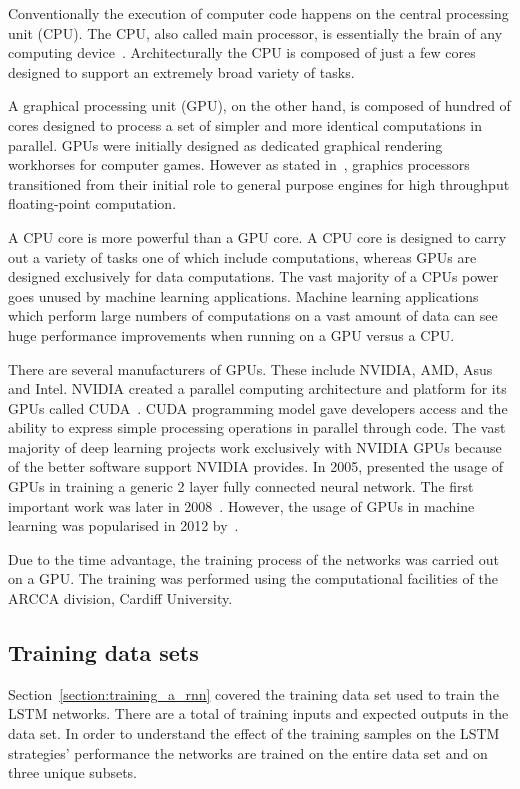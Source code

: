 Conventionally the execution of computer code happens on the central processing
unit (CPU). The CPU, also called main processor, is essentially the brain of any
computing device~\cite{Berger2005}. Architecturally the CPU is composed of just
a few cores designed to support an extremely broad variety of tasks.

A graphical processing unit (GPU), on the other hand, is composed of hundred of
cores designed to process a set of simpler and more identical computations in
parallel. GPUs were initially designed as dedicated graphical rendering
workhorses for computer games. However as stated in~\cite{Catanzaro2008},
graphics processors transitioned from their initial role to general purpose
engines for high throughput floating-point computation.

A CPU core is more powerful than a GPU core. A CPU core is designed to carry out
a variety of tasks one of which include computations, whereas GPUs are designed
exclusively for data computations. The vast majority of a CPUs power goes unused
by machine learning applications. Machine learning applications which perform
large numbers of computations on a vast amount of data can see huge performance
improvements when running on a GPU versus a CPU.

There are several manufacturers of GPUs. These include NVIDIA, AMD, Asus and
Intel. NVIDIA created a parallel computing architecture and platform for its
GPUs called CUDA~\cite{Harris2008}. CUDA programming model gave developers
access and the ability to express simple processing operations in parallel
through code. The vast majority of deep learning projects work exclusively with
NVIDIA GPUs because of the better software support NVIDIA provides. In 2005,
\cite{Steinkraus2005} presented the usage of GPUs in training a generic 2 layer
fully connected neural network. The first important work was later in
2008~\cite{Raina2009}. However, the usage of GPUs in machine learning was
popularised in 2012 by~\cite{Krizhevsky2012}.

Due to the time advantage, the training process of the networks was carried out
on a GPU. The training was performed using the computational facilities of the
ARCCA division, Cardiff University.

\subsection{Training data sets}

Section~\ref{section:training_a_rnn} covered the training data set used to train
the LSTM networks. There are a total of \trainingpoint training inputs and expected
outputs in the data set. In order to understand the effect of the training
samples on the LSTM strategies' performance the networks are trained on the
entire data set and on three unique subsets.

